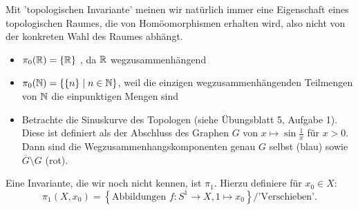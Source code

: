 \begin{remark*}
    Mit 'topologischen Invariante' meinen wir natürlich immer eine Eigenschaft eines topologischen Raumes, die von Homöomorphismen erhalten wird, also nicht von der konkreten Wahl des Raumes abhängt.
\end{remark*}

\begin{example}
    \begin{itemize}
        \item $\pi_0(\mathbb{R}) = \left \{\mathbb{R}\right\}$ , da $\mathbb{R}$ wegzusammenhängend
        \item $\pi_0(\mathbb{N}) = \left \{\left \{n\right\} \mid n\in \mathbb{N}\right\}$, weil die einzigen wegzusammenhängenden Teilmengen von $\mathbb{N}$ die einpunktigen Mengen sind
        \item Betrachte die Sinuskurve des Topologen (siehe Übungsblatt 5, Aufgabe 1). Diese ist definiert als der Abschluss des Graphen $G$ von $x \mapsto \sin  \frac{1}{x}$ für $x>0$. Dann sind die Wegzusammenhangskomponenten genau $G$ selbst (blau) sowie  $\overline{G} \setminus G$ (rot). \\
            \begin{minipage}{\textwidth}
            \centering
            \end{minipage}
    \end{itemize}
\end{example}
\begin{example}
    Eine Invariante, die wir noch nicht kennen, ist $\pi_1$. Hierzu definiere für $x_0\in X$:
    \[
        \pi_1(X,x_0) = \left \{\text{Abbildungen } f\colon S^1 \to  X, 1 \mapsto x_0\right\} / \text{'Verschieben'}
    .\] 
\end{example}
